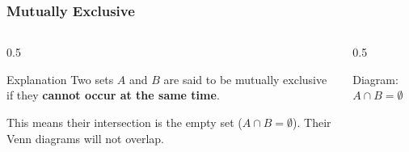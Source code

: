 \begin{frame}
    \frametitle{Mutually Exclusive}
    
    \begin{columns}[T]
        \begin{column}{0.5\textwidth}
            \begin{block}{Explanation}
                Two sets $A$ and $B$ are said to be mutually exclusive if they \textbf{cannot occur at the same time}.
                \vspace{1cm}
                
                This means their intersection is the empty set (\(A \cap B = \emptyset\)). Their Venn diagrams will not overlap.
            \end{block}
        \end{column}
        
        \begin{column}{0.5\textwidth}
            \begin{block}{Diagram: \(A \cap B = \emptyset \)}
                \centering
            \end{block}
        \end{column}
    \end{columns}
\end{frame}

